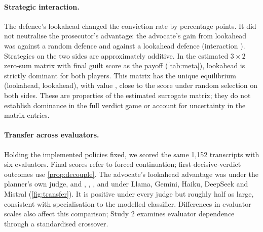 \paragraph{Strategic interaction.}
The defence's lookahead changed the conviction rate by \ConvDef{} percentage points. It did not neutralise the prosecutor's
advantage: the advocate's gain from lookahead was \AdvLookDefRand{} against a random defence and \AdvLookDefLook{}
against a lookahead defence (interaction \PxD{}). Strategies on the two sides are approximately additive. In the estimated
$3\times2$ zero-sum matrix with final guilt score as the payoff (\cref{tab:meta}), lookahead is strictly dominant
for both players. This matrix has the unique equilibrium (lookahead, lookahead), with value \MetaValue{}, close to
the score under random selection on both sides. These are properties of the estimated surrogate matrix; they do
not establish dominance in the full verdict game or account for uncertainty in the matrix entries.

\begin{table}[t]
\centering\small
\caption{Estimated policy meta-game: mean final probability of guilt (primary judge) by prosecutor and defence selection rule, advocate
objective. NE = Nash-equilibrium weights of the zero-sum game in which the prosecutor maximises and the defence
minimises this payoff.}\label{tab:meta}

\vspace{0.8em}
\caption{Judge panel scoring the same 1,152 transcripts: final probability of guilt (mean, SD), discrimination between
twins, and the advocate's lookahead advantage with its $p$-value. ``Soft'' = renormalised mean over returned
integer tokens, with a stated-score fallback; ``stated'' = the number the judge wrote.}\label{tab:judges}

\end{table}

\paragraph{Transfer across evaluators.}
Holding the implemented policies fixed, we scored the same 1,152 transcripts with six evaluators. Final scores
refer to forced continuation; first-decisive-verdict outcomes use \cref{prop:decouple}.
The advocate's lookahead advantage was \AdvLookJudgeA{} under the planner's own judge, and \AdvLookJudgeB{},
\AdvLookJudgeC{}, \AdvLookJudgeD{}, \AdvLookJudgeE{} and \AdvLookJudgeF{} under Llama, Gemini, Haiku, DeepSeek and
Mistral (\cref{fig:transfer}). It is positive under every judge but roughly half as large, consistent with
specialisation to the modelled classifier. Differences in evaluator scales also affect this comparison; Study 2
examines evaluator dependence through a standardised crossover.

